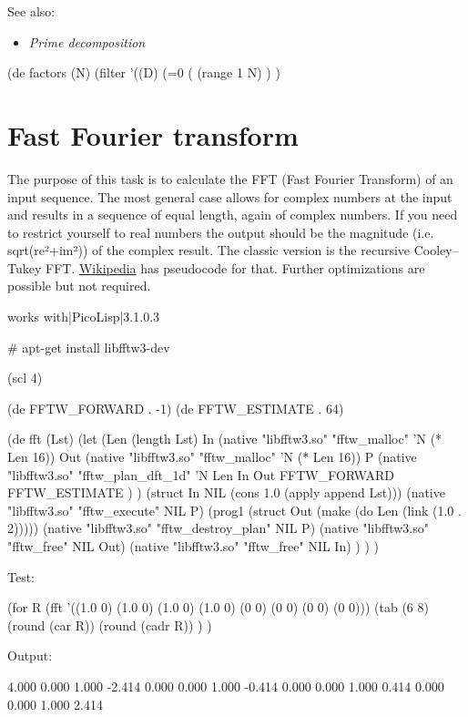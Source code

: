 See also:

\begin{itemize}
\item
  \emph{Prime decomposition}
\end{itemize}


\begin{wideverbatim}

(de factors (N)
   (filter
      '((D) (=0 (%
      (range 1 N) ) )
\end{wideverbatim}

\pagebreak{}
\section*{Fast Fourier transform}

The purpose of this task is to calculate the FFT (Fast Fourier
Transform) of an input sequence. The most general case allows for
complex numbers at the input and results in a sequence of equal length,
again of complex numbers. If you need to restrict yourself to real
numbers the output should be the magnitude (i.e. sqrt(re²+im²)) of the
complex result. The classic version is the recursive Cooley--Tukey FFT.
\href{http://en.wikipedia.org/wiki/Cooley--Tukey\_FFT\_algorithm}{Wikipedia}
has pseudocode for that. Further optimizations are possible but not
required.


\begin{wideverbatim}

{{works with|PicoLisp|3.1.0.3}}

# apt-get install libfftw3-dev

(scl 4)

(de FFTW_FORWARD . -1)
(de FFTW_ESTIMATE . 64)

(de fft (Lst)
   (let
      (Len (length Lst)
         In (native "libfftw3.so" "fftw_malloc" 'N (* Len 16))
         Out (native "libfftw3.so" "fftw_malloc" 'N (* Len 16))
         P (native "libfftw3.so" "fftw_plan_dft_1d" 'N
            Len In Out FFTW_FORWARD FFTW_ESTIMATE ) )
      (struct In NIL (cons 1.0 (apply append Lst)))
      (native "libfftw3.so" "fftw_execute" NIL P)
      (prog1 (struct Out (make (do Len (link (1.0 . 2)))))
         (native "libfftw3.so" "fftw_destroy_plan" NIL P)
         (native "libfftw3.so" "fftw_free" NIL Out)
         (native "libfftw3.so" "fftw_free" NIL In) ) ) )

Test:

(for R (fft '((1.0 0) (1.0 0) (1.0 0) (1.0 0) (0 0) (0 0) (0 0) (0 0)))
   (tab (6 8)
      (round (car R))
      (round (cadr R)) ) )

Output:

 4.000   0.000
 1.000  -2.414
 0.000   0.000
 1.000  -0.414
 0.000   0.000
 1.000   0.414
 0.000   0.000
 1.000   2.414

\end{wideverbatim}

